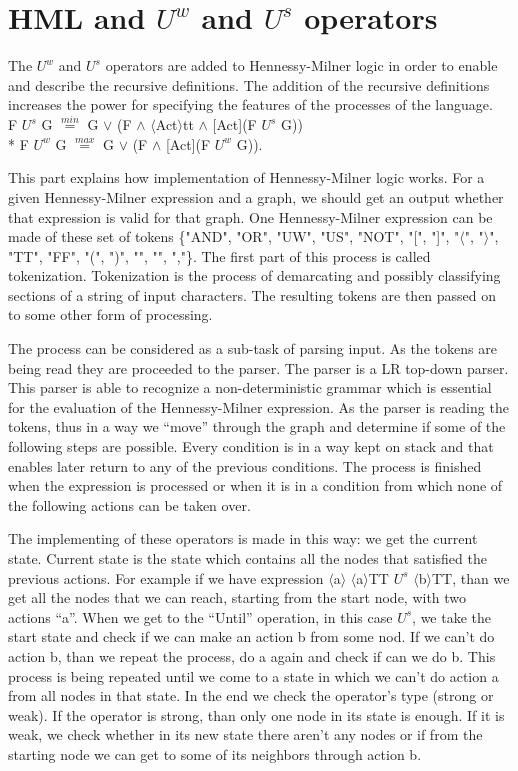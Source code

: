 \section{HML and $U^w$ and $U^s$ operators}
The $U^w$  and $U^s$ operators are added to Hennessy-Milner logic in order to enable and describe the recursive definitions. The addition of the recursive definitions increases the power for specifying the features of the processes of the language.
\\
F $U^s$ G $\stackrel{min}{=}$ G $\vee$ (F $\wedge$ $\langle$Act$\rangle$tt $\wedge$ [Act](F $U^s$ G))\\*
F $U^w$ G $\stackrel{max}{=}$ G $\vee$ (F $\wedge$ [Act](F $U^w$ G)).

This part explains how implementation of Hennessy-Milner logic works. For a given Hennessy-Milner expression and a graph, we should get an output whether that expression is valid for that graph.  One Hennessy-Milner expression can be made of these set of tokens \{"AND", "OR", "UW", "US", "NOT", "[", "]", "$\langle$", "$\rangle$", "TT", "FF", "(", ")", "{", "}", ","\}.  The first part of this process is called tokenization. Tokenization is the process of demarcating and possibly classifying sections of a string of input characters. The resulting tokens are then passed on to some other form of processing.

The process can be considered as a sub-task of parsing input. As the tokens are being read they are proceeded to the parser. The parser is a LR top-down parser. This parser is able to recognize a non-deterministic grammar which is essential for the evaluation of the Hennessy-Milner expression. As the parser is reading the tokens, thus in a way we “move” through the graph and determine if some of the following steps are possible. Every condition is in a way kept on stack and that enables later return to any of the previous conditions. The process is finished when the expression  is processed or when it is in a condition from which none of the following actions can be taken over.

The implementing of these operators is made in this way: we get the current state. Current state is the state which contains all the nodes that satisfied the previous actions. For example if we have expression $\langle$a$\rangle$ $\langle$a$\rangle$TT $U^s$ $\langle$b$\rangle$TT, than we get all the nodes that we can reach, starting from the start node, with two actions “a”. When we get to the “Until” operation, in this case $U^s$, we take the start state and check if we can make an action b from some nod. If we can’t do action b, than we repeat the process, do a again and check if can we do b. This process is being repeated until we come to a state in which we can't do action a from all nodes in that state.
In the end we check the operator’s type (strong or weak). If the operator is strong, than only one node in its state is enough. If it is weak, we check whether in its new state there aren’t any nodes or if from the starting node we can get to some of its neighbors through action b. \\

